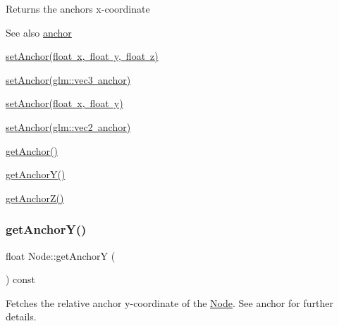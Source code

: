 \begin{DoxyReturn}{Returns}
the anchor\textquotesingle{}s x-\/coordinate 
\end{DoxyReturn}
\begin{DoxySeeAlso}{See also}
\mbox{\hyperlink{classsage_1_1Node_a8698d732514fa2caba0ccee46dbae17a}{anchor}} 

\mbox{\hyperlink{classsage_1_1Node_a04d15cec594320725e6ef44756346d2a}{set\+Anchor(float x, float y, float z)}} 

\mbox{\hyperlink{classsage_1_1Node_a96a786cd6d6750d60c8195aa4895de7c}{set\+Anchor(glm\+::vec3 anchor)}} 

\mbox{\hyperlink{classsage_1_1Node_a8813a645a74f6ab59b25d434e65035c6}{set\+Anchor(float x, float y)}} 

\mbox{\hyperlink{classsage_1_1Node_a957a7e578660950b8518926239397ea0}{set\+Anchor(glm\+::vec2 anchor)}} 

\mbox{\hyperlink{classsage_1_1Node_a1314e39981d8adee8a75c96f29c9e181}{get\+Anchor()}} 

\mbox{\hyperlink{classsage_1_1Node_a78c5f86d0081854603178fb52d8c0a9b}{get\+Anchor\+Y()}} 

\mbox{\hyperlink{classsage_1_1Node_a13d0e0b056b8e29091e385f17f8c62f6}{get\+Anchor\+Z()}} 
\end{DoxySeeAlso}
\mbox{\label{classsage_1_1Node_a78c5f86d0081854603178fb52d8c0a9b}} 
\subsubsection{\texorpdfstring{getAnchorY()}{getAnchorY()}}
{\footnotesize\ttfamily float Node\+::get\+AnchorY (\begin{DoxyParamCaption}{ }\end{DoxyParamCaption}) const}



Fetches the relative anchor y-\/coordinate of the \mbox{\hyperlink{classsage_1_1Node}{Node}}. See anchor for further details. 

